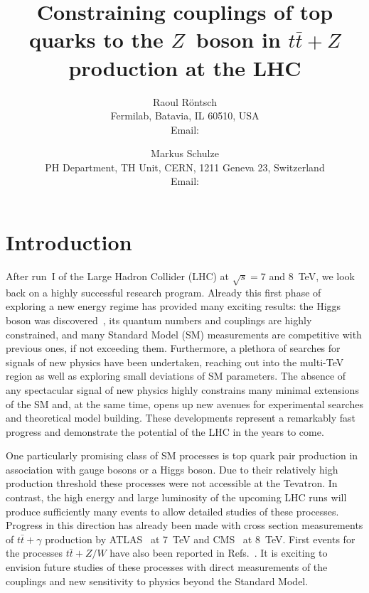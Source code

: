 \documentclass{JHEP3}
\title{Constraining couplings of top quarks to the $Z$~boson in $t\bar{t}+Z$ production at the LHC}
\author{Raoul R\"ontsch \\ Fermilab, Batavia, IL 60510, USA \\
  Email: \email{rontsch@fnal.gov} }
\author{Markus Schulze \\ PH Department, TH Unit, CERN, 1211 Geneva 23, Switzerland \\
  Email: \email{markus.schulze@cern.ch} }
\def\ttb{t\bar{t}}
\begin{document}
\section{Introduction}
After run~I of the Large Hadron Collider (LHC) at $\sqrt{s}=7$ and 8~TeV, we look back on a highly successful research program.
Already this first phase of exploring a new energy regime has provided many exciting results: 
the Higgs boson was discovered~\cite{Chatrchyan:2012ufa,Aad:2012tfa}, its quantum numbers and couplings are highly constrained,
and many Standard Model (SM) measurements are competitive with previous ones, if not exceeding them.
Furthermore, a plethora of searches for signals of new physics have been undertaken, reaching out into the multi-TeV region as well as
exploring small deviations of SM parameters. 
The absence of any spectacular signal of new physics highly constrains many minimal extensions of the SM and, at the same time, 
opens up new avenues for
experimental searches and theoretical model building.
These developments represent a remarkably fast progress and demonstrate the potential of the LHC in the years to come.

One particularly promising class of SM processes is top quark pair production in association with gauge bosons or a Higgs boson.
Due to their relatively high production threshold these processes were not accessible at the Tevatron. 
In contrast, the high energy and large luminosity of the upcoming LHC runs will produce sufficiently many events to allow detailed studies of these processes.
Progress in this direction has already been made with cross section measurements of $\ttb+\gamma$ production by ATLAS~\cite{ATLAS:2011nka} at 7~TeV  
and CMS~\cite{CMS:2014wma} at 8~TeV. First events for the processes $\ttb+Z/W$  have also been reported in Refs.~\cite{ATLAS-CONF-2012-126,Chatrchyan:2013qca}.
It is exciting to envision future studies of these processes with direct measurements of the couplings and new sensitivity to physics beyond the Standard Model. 
\end{document}

